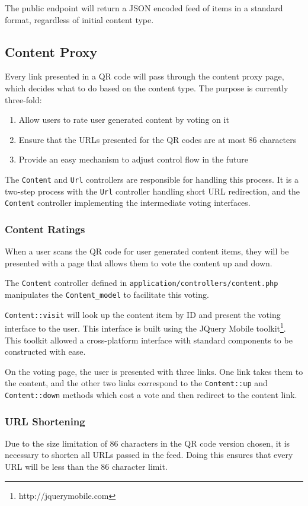 The public endpoint will return a JSON encoded feed of items in a standard format, regardless of initial content type.

\subsection{Content Proxy}
Every link presented in a QR code will pass through the content proxy page, which decides what to do based on the content type. The purpose is currently three-fold:

\begin{enumerate}
	\item Allow users to rate user generated content by voting on it
	\item Ensure that the URLs presented for the QR codes are at most 86 characters
	\item Provide an easy mechanism to adjust control flow in the future
\end{enumerate}

The \texttt{Content} and \texttt{Url} controllers are responsible for handling this process. It is a two-step process with the \texttt{Url} controller handling short URL redirection, and the \texttt{Content} controller implementing the intermediate voting interfaces.

\subsubsection{Content Ratings}
When a user scans the QR code for user generated content items, they will be presented with a page that allows them to vote the content up and down.

The \texttt{Content} controller defined in \texttt{application/controllers/content.php} manipulates the \texttt{Content\_model} to facilitate this voting.

\texttt{Content::visit} will look up the content item by ID and present the voting interface to the user. This interface is built using the JQuery Mobile toolkit\footnote{http://jquerymobile.com}. This toolkit allowed a cross-platform interface with standard components to be constructed with ease.

On the voting page, the user is presented with three links. One link takes them to the content, and the other two links correspond to the \texttt{Content::up} and \texttt{Content::down} methods which cost a vote and then redirect to the content link.

\subsubsection{URL Shortening}
Due to the size limitation of 86 characters in the QR code version chosen, it is necessary to shorten all URLs passed in the feed. Doing this ensures that every URL will be less than the 86 character limit.

